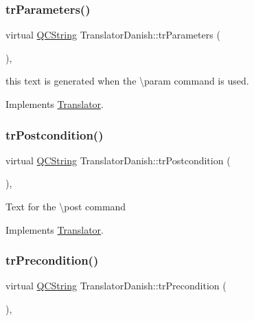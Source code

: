 \mbox{\label{class_translator_danish_a9b88bbcfc4fcb0a2bb39ef9a0f57d71a}} 
\subsubsection{\texorpdfstring{trParameters()}{trParameters()}}
{\footnotesize\ttfamily virtual \mbox{\hyperlink{class_q_c_string}{Q\+C\+String}} Translator\+Danish\+::tr\+Parameters (\begin{DoxyParamCaption}{ }\end{DoxyParamCaption})\hspace{0.3cm}{\ttfamily [inline]}, {\ttfamily [virtual]}}

this text is generated when the \textbackslash{}param command is used. 

Implements \mbox{\hyperlink{class_translator}{Translator}}.

\mbox{\label{class_translator_danish_a7aa83866089ee54ba4e32605cb33a3bd}} 
\subsubsection{\texorpdfstring{trPostcondition()}{trPostcondition()}}
{\footnotesize\ttfamily virtual \mbox{\hyperlink{class_q_c_string}{Q\+C\+String}} Translator\+Danish\+::tr\+Postcondition (\begin{DoxyParamCaption}{ }\end{DoxyParamCaption})\hspace{0.3cm}{\ttfamily [inline]}, {\ttfamily [virtual]}}

Text for the \textbackslash{}post command 

Implements \mbox{\hyperlink{class_translator}{Translator}}.

\mbox{\label{class_translator_danish_ab965213cf0fce79c44112ea43a58372c}} 
\subsubsection{\texorpdfstring{trPrecondition()}{trPrecondition()}}
{\footnotesize\ttfamily virtual \mbox{\hyperlink{class_q_c_string}{Q\+C\+String}} Translator\+Danish\+::tr\+Precondition (\begin{DoxyParamCaption}{ }\end{DoxyParamCaption})\hspace{0.3cm}{\ttfamily [inline]}, {\ttfamily [virtual]}}

